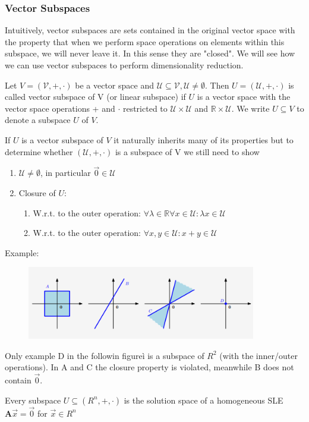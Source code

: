 \subsubsection{Vector Subspaces}
Intuitively, vector subspaces are sets contained in the original vector space with the property that when we perform space operations on elements within this subspace, we will never leave it. In this sense they are "closed". We will see how we can use vector subspaces to perform dimensionality reduction.
\begin{definition}
    Let $V = (\mathcal{V}, +, \cdot)$ be a vector space and $\mathcal{U} \subseteq \mathcal{V}, \mathcal{U} \neq \emptyset$. Then $U = (\mathcal{U},+,\cdot)$ is called vector subspace of V (or linear subspace) if $U$ is a vector space with the vector space operations + and $\cdot$ restricted to $\mathcal{U} \times \mathcal{U}$ and $\mathbb{R} \times \mathcal{U}$. We write $U \subseteq V$ to denote a subspace $U$ of $V$.
\end{definition}
If $U$ is a vector subspace of $V$ it naturally inherits many of its properties but to determine whether $(\mathcal{U}, +, \cdot)$ is a subspace of V we still need to show
\begin{enumerate}
    \item $\mathcal{U} \neq \emptyset$, in particular $\vec{0} \in \mathcal{U}$
    \item Closure of $U$:
    \begin{enumerate}
        \item W.r.t. to the outer operation: $\forall \lambda \in \mathbb{R} \forall x \in \mathcal{U}: \lambda x \in \mathcal{U}$
        \item W.r.t. to the outer operation: $\forall x,y \in \mathcal{U}: x + y \in \mathcal{U}$
    \end{enumerate}
\end{enumerate}
Example:
\begin{figure}[htbp]
    \centering
    \includegraphics[width=10cm]{Mathematical Background/example-subspace-recognition.png}
\end{figure}
Only example D in the followin figureì is a subspace of $R^2$ (with the inner/outer operations). In A and C the closure property is violated, meanwhile B does not contain $\vec{0}$.
\begin{remark}
    Every subspace $U \subseteq (R^n, + ,\cdot)$ is the solution space of a homogeneous SLE $\mathbf{A}\vec{x} = \vec{0}$ for $\vec{x} \in R^n$
\end{remark}
